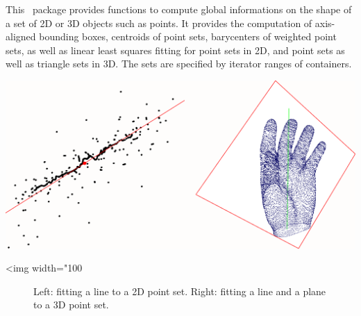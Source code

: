 This \cgal\ package provides functions to compute global informations
on the shape of a set of 2D or 3D objects such as points. It provides the computation of axis-aligned bounding boxes, centroids of point sets, barycenters of weighted point sets, as well as linear least squares fitting for point sets in 2D, and point sets as well as triangle sets in 3D. The sets are specified by iterator ranges of containers.\\

\begin{center}
    \label{fit}
    \begin{ccTexOnly}
      \includegraphics[width=1.0\textwidth]{Principal_component_analysis/fit}
    \end{ccTexOnly}
    \begin{ccHtmlOnly}
        <img width="100%
    \end{ccHtmlOnly}
    \begin{figure}[h]
        \caption{Left: fitting a line to a 2D point set.
                 Right: fitting a line and a plane to a 3D point set.}
    \end{figure}
\end{center}

